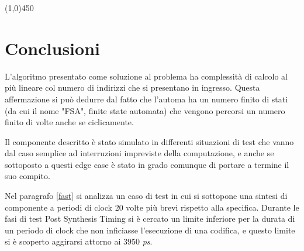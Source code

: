 \documentclass{article}
\begin{document}
\bigskip
\bigskip


\begin{center}
\line(1,0){450}
\end{center}



\newpage


\section{Conclusioni}
L'algoritmo presentato come soluzione al problema ha complessità di calcolo al più lineare col numero di indirizzi che si presentano in ingresso. Questa affermazione si può dedurre dal fatto che l'automa ha un numero finito di stati (da cui il nome "FSA", finite state automata) che vengono percorsi un numero finito di volte anche se ciclicamente.

\smallskip

Il componente descritto è stato simulato in differenti situazioni di test che vanno dal caso semplice ad interruzioni impreviste della computazione, e anche se sottoposto a questi edge case è stato in grado comunque di portare a termine il suo compito.

\smallskip

Nel paragrafo \ref{fast} si analizza un caso di test in cui si sottopone una sintesi di componente a periodi di clock 20 volte più brevi rispetto alla specifica. Durante le fasi di test Post Synthesis Timing si è cercato un limite inferiore per la durata di un periodo di clock che non inficiasse l'esecuzione di una codifica, e questo limite si è scoperto aggirarsi attorno ai 3950 \emph{ps}.
\end{document}
